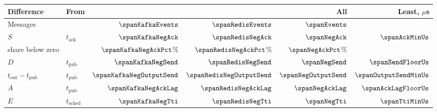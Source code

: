\setlength{\tabcolsep}{4pt}
\begin{tabular}{@{}llrrrr@{}}
\toprule
Difference & From & \kafka{} & \redis{} & All & Least, $\mu$s \\
\midrule
Messages &  & $\spanKafkaEvents$ & $\spanRedisEvents$ & $\spanEvents$ &  \\
\midrule
$S$ & $t_{\mathrm{ack}}$ & $\spanKafkaNegAck$ & $\spanRedisNegAck$ & $\spanNegAck$ & $\spanAckMinUs$ \\
\quad share below zero &  & $\spanKafkaNegAckPct$\% & $\spanRedisNegAckPct$\% & $\spanNegAckPct$\% &  \\
\midrule
$D$ & $t_{\mathrm{pub}}$ & $\spanKafkaNegSend$ & $\spanRedisNegSend$ & $\spanNegSend$ & $\spanSendFloorUs$ \\
$t_{\mathrm{out}}-t_{\mathrm{pub}}$ & $t_{\mathrm{pub}}$ & $\spanKafkaNegOutputSend$ & $\spanRedisNegOutputSend$ & $\spanNegOutputSend$ & $\spanOutputSendMinUs$ \\
$A$ & $t_{\mathrm{pub}}$ & $\spanKafkaNegAckLag$ & $\spanRedisNegAckLag$ & $\spanNegAckLag$ & $\spanAckLagFloorUs$ \\
$E$ & $t_{\mathrm{sched}}$ & $\spanKafkaNegTti$ & $\spanRedisNegTti$ & $\spanNegTti$ & $\spanTtiMinUs$ \\
\bottomrule
\end{tabular}
